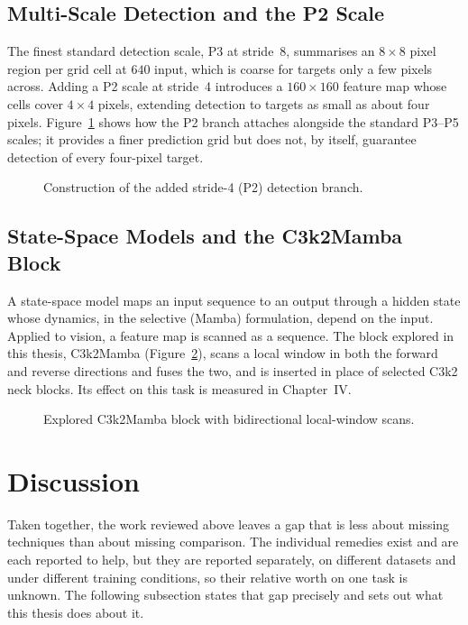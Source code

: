 \subsection{Multi-Scale Detection and the P2 Scale}
The finest standard detection scale, P3 at stride~8, summarises an $8\times8$ pixel
region per grid cell at $640$ input, which is coarse for targets only a few pixels
across. Adding a P2 scale at stride~4 introduces a $160\times160$ feature map whose
cells cover $4\times4$ pixels, extending detection to targets as small as about
four pixels. Figure~\ref{fig:p2} shows how the P2 branch attaches alongside the
standard P3--P5 scales; it provides a finer prediction grid but does not, by
itself, guarantee detection of every four-pixel target.

\begin{figure}[tbp]
  \centering
  \caption{Construction of the added stride-4 (P2) detection branch.}
  \label{fig:p2}
\end{figure}

\subsection{State-Space Models and the C3k2Mamba Block}
A state-space model maps an input sequence to an output through a hidden state
whose dynamics, in the selective (Mamba) formulation, depend on the input. Applied
to vision, a feature map is scanned as a sequence. The block explored in this
thesis, C3k2Mamba (Figure~\ref{fig:mamba}), scans a local window in both the forward
and reverse directions and fuses the two, and is inserted in place of selected C3k2
neck blocks. Its effect on this task is measured in Chapter~IV.

\begin{figure}[tbp]
  \centering
  \caption{Explored C3k2Mamba block with bidirectional local-window scans.}
  \label{fig:mamba}
\end{figure}

\section{Discussion}

Taken together, the work reviewed above leaves a gap that is less about missing
techniques than about missing comparison. The individual remedies exist and are
each reported to help, but they are reported separately, on different datasets
and under different training conditions, so their relative worth on one task is
unknown. The following subsection states that gap precisely and sets out what
this thesis does about it.

